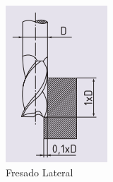 \begin{figure}[hbt]
    \centering
    \begin{subfigure}{0.3\textwidth}
        \centering
        \includegraphics[width=0.9\linewidth]{Cap4_DisenoBasico/Figura/Fresado_Lateral.PNG}
        \caption{Fresado Lateral}
        \label{fig:Fresado_Lateral}
    \end{subfigure} 
    \centering
    \begin{subfigure}{0.3\textwidth}
        \centering

\end{subfigure}
\end{figure}
